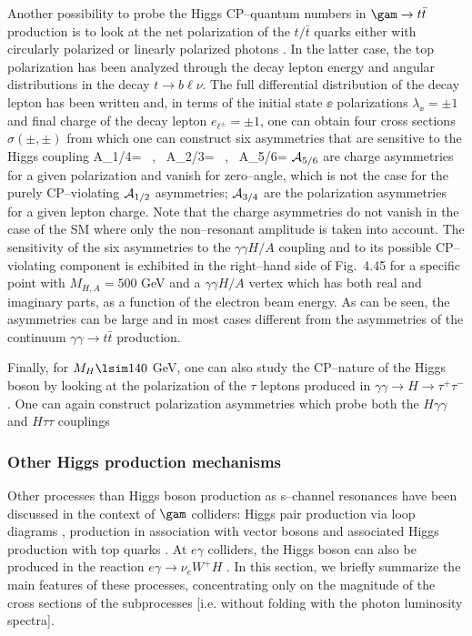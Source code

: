 Another possibility to probe the Higgs CP--quantum numbers in $\gam \to t\bar 
t$ production is to look at the net polarization of the $t/\bar t$ quarks
either with circularly polarized \cite{gam-Htt-Asa2} or linearly polarized 
photons \cite{gam-Htt-Roh}. In the latter case, the top polarization has been 
analyzed through the decay lepton energy and angular distributions in the decay
$t\to b \ell \nu$. The full differential distribution of the decay lepton
has been written and, in terms of the initial state $\ee$ polarizations
$\lambda_{\ee}=\pm1$ and final charge   of the decay lepton $e_{\ell^\pm}=
\pm 1$, one can obtain four cross sections $\sigma (\pm, \pm)$ from which
one can construct six asymmetries that are sensitive to the Higgs coupling
\cite{gam-Htt-Roh}
\beq
{\cal A}_{1/4}=  \frac{\sigma(+,\pm)-\sigma(-,-)}{\sigma(+,\pm)+\sigma(-,-)}
\, , \ 
{\cal A}_{2/3}=  \frac{\sigma(+,\mp)-\sigma(-,+)}{\sigma(+,\mp)+\sigma(-,+)}
\, , \ 
{\cal A}_{5/6}=\frac{\sigma(\pm,+)-\sigma(\pm,-)}{\sigma(\pm,+)+\sigma(\pm,-)}
\label{asymm}
\eeq
${\cal A}_{5/6}$ are charge asymmetries for a given polarization and 
vanish for zero--angle, which is not the case for the purely CP--violating
${\cal A}_{1/2}$ asymmetries;  ${\cal A}_{3/4}$ are the polarization
asymmetries for a given lepton charge. Note that the charge asymmetries do not
vanish in the case of the SM where only the non--resonant amplitude is taken
into account. The sensitivity of the six asymmetries to the $\gamma\gamma H/A$
coupling and to its possible CP--violating component is exhibited in the 
right--hand side of Fig.~4.45 for a specific point with $M_{H,A}=500$ GeV 
and a $\gamma \gamma H/A$ vertex which has both real and imaginary parts, 
as a function of the electron beam energy. As can be seen, the asymmetries can 
be large and in most cases different from  the asymmetries of the continuum
$\gamma \gamma \to t \bar t$ production. \s 

Finally, for  $M_H \lsim 140$ GeV, one can also study the CP--nature of the 
Higgs boson by looking at the polarization of the $\tau$ leptons produced in 
$\gamma \gamma \to H \to \tau^+ \tau^-$. One can again construct polarization 
asymmetries which probe  both the $H\gamma \gamma$ and $H\tau \tau$ couplings 
\cite{gam-Hll-Singh}

\subsubsection{Other Higgs production mechanisms}

Other processes than Higgs boson production as s--channel resonances have been
discussed in the context of $\gam$ colliders: Higgs pair production via
loop diagrams \cite{gam-HH,gam-HH1}, production  in association with vector
bosons \cite{gam-WWH, gam-WWHH,gam-HZ} and associated Higgs production
with top quarks \cite{gam-ttH}. At $e\gamma$ colliders, the Higgs boson can
also be produced in the reaction $e\gamma \to \nu_eW^+ H$
\cite{egam-H,egam-Hall}.  In this section, we briefly summarize the main
features of these processes, concentrating only on the magnitude of the cross
sections of the subprocesses [i.e. without folding with the photon luminosity
spectra].  

